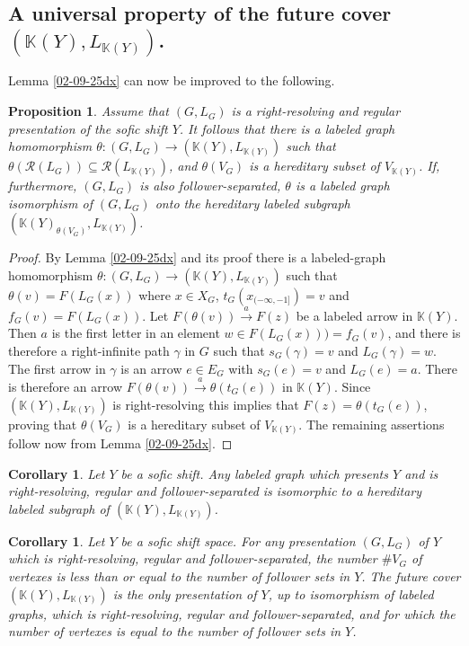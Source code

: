 \documentclass[12pt,oneside,english]{amsart}
\newtheorem{corollary}[thm]{Corollary}
\newtheorem{prop}[thm]{Proposition}
\begin{document}
\subsection{A universal property of the future cover $(\mathbb K(Y),L_{\mathbb K(Y)})$.}

 Lemma \ref{02-09-25dx} can now be improved to the following.



\begin{prop}\label{25-09-25} Assume that $(G,L_G)$ is a right-resolving and regular presentation of the sofic shift $Y$. It follows that there is a labeled graph homomorphism 
$\theta : (G,L_G) \to (\mathbb K(Y), L_{\mathbb K(Y)})$ 
such that $
\theta\left(\mathcal R(L_G)\right) \subseteq \mathcal R(L_{\mathbb K(Y)})$,
and $\theta(V_G)$ is a hereditary subset of $V_{\mathbb K(Y)}$. If, furthermore, $(G,L_G)$ is also follower-separated, $\theta$ is a labeled graph isomorphism of $(G,L_G)$ onto the hereditary labeled subgraph $(\mathbb K(Y)_{\theta(V_G)}, L_{\mathbb K(Y)})$.
\end{prop}
\begin{proof} By Lemma \ref{02-09-25dx} and its proof there is a labeled-graph homomorphism $\theta : (G,L_G) \to (\mathbb K(Y), L_{\mathbb K(Y)})$ such that
$\theta(v) =F(L_G(x))$ where $x \in X_G$, $t_G(x_{(-\infty,-1]}) =v$ and $f_G(v) = F(L_G(x))$. Let $F(\theta(v)) \overset{a}{\to} F(z)$ be a labeled arrow in $\mathbb K(Y)$. Then $a$ is the first letter in an element $w \in F(L_G(x))) = f_G(v)$, and there is therefore a right-infinite path $\gamma$ in $G$ such that $s_G(\gamma) = v$ and $L_G(\gamma) = w$. The first arrow in $\gamma$ is an arrow $e \in E_G$ with $s_G(e) = v$ and $L_G(e) = a$. There is therefore an arrow $F(\theta(v)) \overset{a}{\to} \theta(t_G(e))$ in $\mathbb K(Y)$. Since $(\mathbb K(Y),L_{\mathbb K(Y)})$ is right-resolving this implies that $F(z) = \theta(t_G(e))$, proving that $\theta(V_G)$ is a hereditary subset of $V_{\mathbb K(Y)}$. The remaining assertions follow now from  Lemma \ref{02-09-25dx}.

 
\end{proof}


\begin{corollary}\label{29-09-25} Let $Y$ be a sofic shift. Any labeled graph which presents $Y$ and is right-resolving, regular and follower-separated is isomorphic to a hereditary labeled subgraph of $(\mathbb K(Y),L_{\mathbb K(Y)})$.
\end{corollary}

\begin{corollary}\label{02-10-25c} Let $Y$ be a sofic shift space. For any presentation $(G,L_G)$ of $Y$ which is right-resolving, regular and follower-separated, the number $\# V_G$ of vertexes is less than or equal to the number of follower sets in $Y$. The future cover $(\mathbb K(Y),L_{\mathbb K(Y)})$ is the only presentation of $Y$, up to isomorphism of labeled graphs, which is right-resolving, regular and follower-separated, and for which the number of vertexes is equal to the number of follower sets in $Y$.
\end{corollary}
\end{document}
